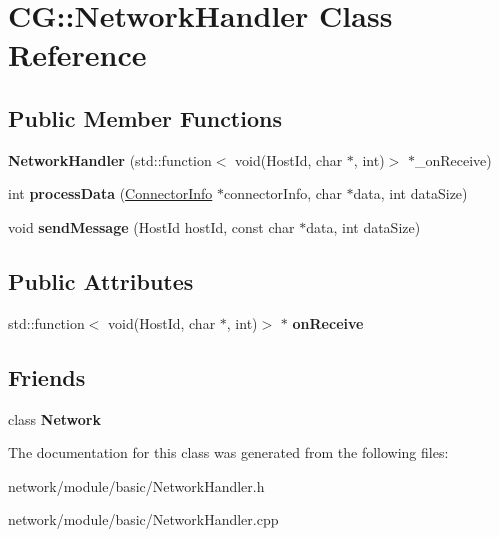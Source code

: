 \hypertarget{class_c_g_1_1_network_handler}{}\section{CG\+:\+:Network\+Handler Class Reference}
\label{class_c_g_1_1_network_handler}
\subsection*{Public Member Functions}
\begin{DoxyCompactItemize}
\item 
\mbox{\label{class_c_g_1_1_network_handler_afa93c724ce75d936ff506e020a98c297}} 
{\bfseries Network\+Handler} (std\+::function$<$ void(Host\+Id, char $\ast$, int)$>$ $\ast$\+\_\+on\+Receive)
\item 
\mbox{\label{class_c_g_1_1_network_handler_a0b49efbd1bfdec05494df318880a6fe1}} 
int {\bfseries process\+Data} (\mbox{\hyperlink{class_c_g_1_1_connector_info}{Connector\+Info}} $\ast$connector\+Info, char $\ast$data, int data\+Size)
\item 
\mbox{\label{class_c_g_1_1_network_handler_ae423c0b4f16c5dd4f3dca1a1927fc910}} 
void {\bfseries send\+Message} (Host\+Id host\+Id, const char $\ast$data, int data\+Size)
\end{DoxyCompactItemize}
\subsection*{Public Attributes}
\begin{DoxyCompactItemize}
\item 
\mbox{\label{class_c_g_1_1_network_handler_aac3677fc874325e5091be15ffee0cfcc}} 
std\+::function$<$ void(Host\+Id, char $\ast$, int)$>$ $\ast$ {\bfseries on\+Receive}
\end{DoxyCompactItemize}
\subsection*{Friends}
\begin{DoxyCompactItemize}
\item 
\mbox{\label{class_c_g_1_1_network_handler_a88b59289ffd793fecd040d32e397b1e9}} 
class {\bfseries Network}
\end{DoxyCompactItemize}


The documentation for this class was generated from the following files\+:\begin{DoxyCompactItemize}
\item 
network/module/basic/Network\+Handler.\+h\item 
network/module/basic/Network\+Handler.\+cpp\end{DoxyCompactItemize}
